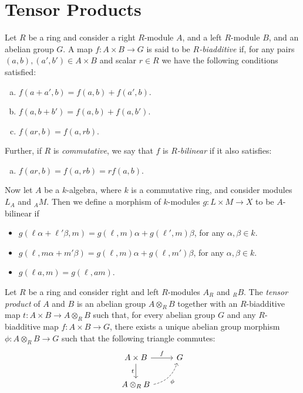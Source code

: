\section{Tensor Products}

\begin{definition}
\label{def:biadditive-and-bilinear-maps}
Let \(R\) be a ring and consider a right \(R\)-module \(A\), and a left
\(R\)-module \(B\), and an abelian group \(G\). A map \(f: A \times B \to G\) is
said to be \emph{\(R\)-biadditive} if, for any pairs \((a, b), (a', b') \in A \times
B\) and scalar \(r \in R\) we have the following conditions satisfied:
\begin{enumerate}[(a)]\setlength\itemsep{0em}
\item \(f(a + a', b) = f(a, b) + f(a', b)\).
\item \(f(a, b + b') = f(a, b) + f(a, b')\).
\item \(f(a r, b) = f(a, r b)\).
\end{enumerate}
Further, if \(R\) is \emph{commutative}, we say that \(f\) is
\emph{\(R\)-bilinear} if it also satisfies:
\begin{enumerate}[(a)]\setlength\itemsep{0em}\setcounter{enumi}{3}
\item \(f(a r, b) = f(a, rb) = r f(a, b)\).
\end{enumerate}

Now let \(A\) be a \(k\)-algebra, where \(k\) is a commutative ring, and
consider modules \(L_A\) and \({}_AM\). Then we define a morphism of
\(k\)-modules \(g: L \times M \to X\) to be \(A\)-bilinear if
\begin{itemize}\setlength\itemsep{0em}
\item \(g(\ell \alpha + \ell' \beta, m) = g(\ell, m) \alpha + g(\ell', m) \beta\), for any \(\alpha, \beta \in k\).
\item \(g(\ell, m \alpha + m' \beta) = g(\ell, m) \alpha + g(\ell, m') \beta\), for any \(\alpha, \beta \in k\).
\item \(g(\ell a, m) = g(\ell, a m)\).
\end{itemize}
\end{definition}

\begin{definition}
\label{def:tensor-product}
Let \(R\) be a ring and consider right and left \(R\)-modules \(A_R\) and
\({}_RB\). The \emph{tensor product} of \(A\) and \(B\) is an abelian group
\(A \otimes_R B\) together with an \(R\)-biadditive map
\(t: A \times B \to A \otimes_R B\) such that, for every abelian group \(G\) and
any \(R\)-biadditive map \(f: A \times B \to G\), there exists a unique abelian
group morphism \(\phi: A \otimes_R B \to G\) such that the following triangle
commutes:
\[
\begin{tikzcd}
A \times B \ar[d, "t"'] \ar[r, "f"] &G \\
A \otimes_R B \ar[ru, dashed, "\phi"', bend right] &
\end{tikzcd}
\]
\end{definition}

